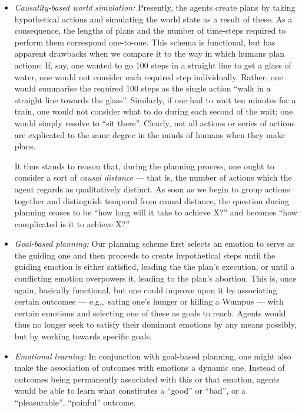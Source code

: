\begin{itemize}
	\item \emph{Causality-based world simulation:} Presently, the agents create plans by taking hypothetical actions and simulating the world state as a result of these. As a consequence, the lengths of plans and the number of time-steps required to perform them correspond one-to-one.
	This schema is functional, but has apparent drawbacks when we compare it to the way in which humans plan actions: If, say, one wanted to go 100 steps in a straight line to get a glass of water, one would not consider each required step individually. Rather, one would summarise the required 100 steps as the single action ``walk in a straight line towards the glass''. Similarly, if one had to wait ten minutes for a train, one would not consider what to do during each second of the wait; one would simply resolve to ``sit there''. Clearly, not all actions or series of actions are explicated to the same degree in the minds of humans when they make plans.
	
	 It thus stands to reason that, during the planning process, one ought to consider a sort of {\em causal distance} --- that is, the number of actions which the agent regards as qualitatively distinct. As soon as we begin to group actions together and distinguish temporal from causal distance, the question during planning ceases to be ``how long will it take to achieve X?'' and becomes ``how complicated is it to achieve X?''
	 
	 \item \emph{Goal-based planning:} Our planning scheme first selects an emotion to serve as the guiding one and then  proceeds to create hypothetical steps until the guiding emotion is either satisfied, leading the the plan's execution, or until a conflicting emotion overpowers it, leading to the plan's abortion. This is, once again, basically functional, but one could improve upon it by associating certain outcomes --- e.g.,\ sating one's hunger or killing a Wumpus --- with certain emotions and selecting one of these as goals to reach. Agents would thus no longer seek to satisfy their dominant emotions by any means possibly, but by working towards specific goals. 
	 
	 \item \emph{Emotional learning:} In conjunction with goal-based planning, one might also make the association of outcomes with emotions a dynamic one. Instead of outcomes being permanently associated with this or that emotion, agents would be able to learn what constitutes a ``good'' or ``bad'', or a ``pleasurable'', ``painful'' outcome. 
	 

\end{itemize}
